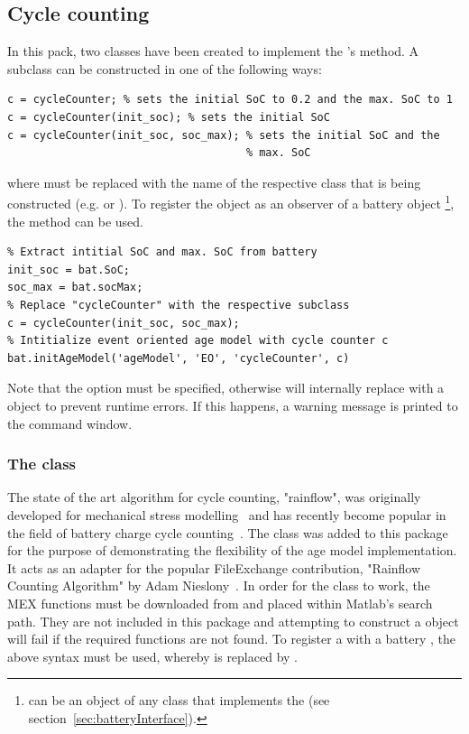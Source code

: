 \subsection{Cycle counting}
\label{sec:cycleCounting}
In this pack, two classes have been created to implement the 's  method.
A  subclass can be constructed in one of the following ways:
\begin{lstlisting}
c = cycleCounter; % sets the initial SoC to 0.2 and the max. SoC to 1
c = cycleCounter(init_soc); % sets the initial SoC
c = cycleCounter(init_soc, soc_max); % sets the initial SoC and the
									 % max. SoC
\end{lstlisting}
where  must be replaced with the name of the respective class that is being constructed (e.g.  or ). To register the object as an observer of a battery object \footnote{ can be an object of any class that implements the  (see section~\ref{sec:batteryInterface}).}, the  method can be used.
\begin{lstlisting}
% Extract intitial SoC and max. SoC from battery
init_soc = bat.SoC;
soc_max = bat.socMax;
% Replace "cycleCounter" with the respective subclass
c = cycleCounter(init_soc, soc_max);
% Intitialize event oriented age model with cycle counter c
bat.initAgeModel('ageModel', 'EO', 'cycleCounter', c)
\end{lstlisting}
Note that the  option must be specified, otherwise  will internally replace  with a  object to prevent runtime errors. If this happens, a warning message is printed to the command window.

\subsubsection{The  class}
The state of the art algorithm for cycle counting, "rainflow", was originally developed for mechanical stress modelling~\cite{matsuishi_fatigue_1968} and has recently become popular in the field of battery charge cycle counting~\cite{dufo-lopez_multi-objective_2008}. The  class was added to this package for the purpose of demonstrating the flexibility of the age model implementation. It acts as an adapter for the popular FileExchange contribution, "Rainflow Counting Algorithm" by Adam Nieslony~\cite{nieslony_rainflow_2010}. In order for the class to work, the MEX functions must be downloaded from \cite{nieslony_rainflow_2010} and placed within Matlab's search path. They are not included in this package and attempting to construct a  object will fail if the required functions are not found. To register a  with a battery , the above syntax must be used, whereby  is replaced by .

